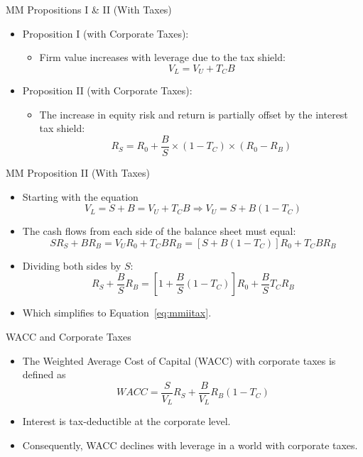 \begin{frame}{MM Propositions I \& II (With Taxes)}
	\begin{itemize}
		\item Proposition I (with Corporate Taxes):
		\begin{itemize}
			\item Firm value increases with leverage due to the tax shield:
			\begin{equation}
				V_L = V_U + T_C B
			\end{equation}
		\end{itemize}
		\item Proposition II (with Corporate Taxes):
		\begin{itemize}
			\item The increase in equity risk and return is partially offset by the interest tax shield:
			\begin{equation}
				R_S = R_0 + \frac{B}{S} \times (1 - T_C) \times (R_0 - R_B)
				\label{eq:mmiitax}
			\end{equation}
		\end{itemize}		
	\end{itemize}
\end{frame}


\begin{frame}{MM Proposition II (With Taxes)}
	\begin{itemize}
		\item Starting with the equation
		\begin{equation*}
			V_L = S + B = V_U + T_C B \Rightarrow V_U = S + B(1 - T_C)
		\end{equation*}
		\item The cash flows from each side of the balance sheet must equal:
		\begin{equation*}
			S R_S + B R_B = V_U R_0 + T_C B R_B = [S + B(1 - T_C)]R_0 + T_C B R_B
		\end{equation*}
		\item Dividing both sides by $S$:
		\begin{equation*}
			R_S + \frac{B}{S} R_B = \left[1 + \frac{B}{S} (1 - T_C)\right]R_0 + \frac{B}{S} T_C R_B
		\end{equation*}
		\item Which simplifies to Equation~\eqref{eq:mmiitax}.
	\end{itemize}
\end{frame}

\begin{frame}{WACC and Corporate Taxes}
	\begin{itemize}
		\item The Weighted Average Cost of Capital (WACC) with corporate taxes is defined as
		\begin{equation}
			WACC = \frac{S}{V_L} R_S + \frac{B}{V_L}R_B (1-T_C)
		\end{equation}
		\item Interest is tax-deductible at the corporate level.
		\item Consequently, WACC declines with leverage in a world with corporate taxes.
	\end{itemize}
\end{frame}


